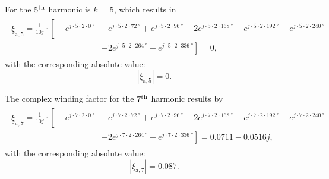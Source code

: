 \begin{solutionblock}
    For the $5\textsuperscript{th}$ harmonic is $k$ = 5, which results in
    \begin{align}
        \begin{split}
            \underline{\xi}_{\mathrm{a,}5} = \frac{1}{10j}\cdot \left[ \right. -e^{j\cdot5\cdot2\cdot\SI{0}{\degree}}
             & +e^{j\cdot5\cdot2\cdot\SI{72}{\degree}}+e^{j\cdot5\cdot2\cdot\SI{96}{\degree}}-2e^{j\cdot5\cdot2\cdot\SI{168}{\degree}}-e^{j\cdot5\cdot2\cdot\SI{192}{\degree}}
            +e^{j\cdot5\cdot2\cdot\SI{240}{\degree}}                                                                                                                           \\
             & +2e^{j\cdot5\cdot2\cdot\SI{264}{\degree}}-e^{j\cdot5\cdot2\cdot\SI{336}{\degree}}
            \left. \right]
            = 0,
        \end{split}
    \end{align}
    with the corresponding absolute value:
    \begin{equation}
        |\xi_{\mathrm{a,}5}| = 0.
    \end{equation}

    The complex winding factor for the $7\textsuperscript{th}$ harmonic results by
    \begin{align}
        \begin{split}
            \underline{\xi}_{\mathrm{a,}7} = \frac{1}{10j}\cdot \left[ \right. -e^{j\cdot7\cdot2\cdot\SI{0}{\degree}}
             & +e^{j\cdot7\cdot2\cdot\SI{72}{\degree}}+e^{j\cdot7\cdot2\cdot\SI{96}{\degree}}-2e^{j\cdot7\cdot2\cdot\SI{168}{\degree}}-e^{j\cdot7\cdot2\cdot\SI{192}{\degree}}
            +e^{j\cdot7\cdot2\cdot\SI{240}{\degree}}                                                                                                                           \\
             & +2e^{j\cdot7\cdot2\cdot\SI{264}{\degree}}-e^{j\cdot7\cdot2\cdot\SI{336}{\degree}}
            \left. \right]
            = 0.0711 - 0.0516j,
        \end{split}
    \end{align}
    with the corresponding absolute value:
    \begin{equation}
        |\xi_{\mathrm{a,}7}| = 0.087.
    \end{equation}


\end{solutionblock}



